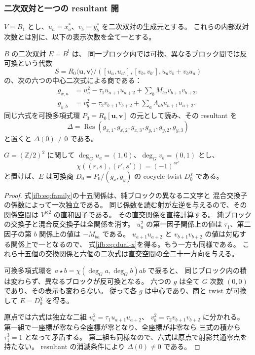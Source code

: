 \subsubsection{二次双対と一つの resultant 開}

$V=B_1$ とし、$u_a=x_a^*$、$v_b=y_b^*$ を二次双対の生成元とする。
これらの内部双対次数とは別に、以下の表示次数を全て一とする。

\begin{proposition}
\label{ifb:prop:dual}
$B$ の二次双対 $E=B^!$ は、
同一ブロック内では可換、異なるブロック間では反可換という代数
\[
 S=R_0\langle\mathbf u,\mathbf v\rangle/
       ([u_a,u_{a'}],[v_b,v_{b'}],u_av_b+v_bu_a)
\]
の、次の六つの中心二次式による商である：
\begin{align}
 g_{x,a}&=u_a^2-\tau_1u_{a+1}u_{a+2}
                 +\sum_bM_{ba}v_{b+1}v_{b+2},\label{ifb:eq:dual-x}\\
 g_{y,b}&=v_b^2-\tau_2v_{b+1}v_{b+2}
                 +\sum_a\Lambda_{ab}u_{a+1}u_{a+2}.
                 \label{ifb:eq:dual-y}
\end{align}
同じ六式を可換多項式環
$P_0=R_0[\mathbf u,\mathbf v]$ の元として読み、その resultant を
\begin{equation}\label{ifb:eq:resultant}
       \Delta=\operatorname{Res}(g_{x,1},g_{x,2},g_{x,3},
                                  g_{y,1},g_{y,2},g_{y,3})
\end{equation}
と置くと $\Delta(0)\ne0$ である。

$G=(\mathbb Z/2)^2$ に関して $\deg_Gu_a=(1,0)$、$\deg_Gv_b=(0,1)$ とし、
\[
 \chi((r,s),(r',s'))=(-1)^{sr'}
\]
と置けば、$E$ は可換商 $D_0=P_0/(g_x,g_y)$ の cocycle twist $D_0^\chi$ である。
\end{proposition}

\begin{proof}
式\eqref{ifb:eq:family}の十五関係は、純ブロックの異なる二文字と
混合交換子の係数によって一次独立である。
同じ係数を読む射が左逆を与えるので、その関係空間は $V^{\otimes2}$ の直和因子である。
その直交関係を直接計算する。
純ブロックの交換子と混合反交換子は全関係を消す。
$u_a^2$ の第一因子関係上の値は $\tau_1$、第二因子の第 $b$ 関係上の値は $-M_{ba}$ である。
$u_{a+1}u_{a+2}$ と $v_{b+1}v_{b+2}$ の値は対応する関係上で一となるので、
式\eqref{ifb:eq:dual-x}を得る。もう一方も同様である。
これら十五個の交換関係と六個の二次式は直交空間の全二十一方向を与える。

可換多項式環を $a\star b=\chi(\deg_Ga,\deg_Gb)ab$ で捩ると、
同じブロック内の積は変わらず、異なるブロックが反可換となる。
六つの $g$ は全て $G$ 次数 $(0,0)$ であり、その表示も変わらない。
従って各 $g$ は中心であり、商と twist が可換して $E=D_0^\chi$ を得る。

原点では六式は独立な二組
$u_a^2=\tau_1u_{a+1}u_{a+2}$、
$v_b^2=\tau_2v_{b+1}v_{b+2}$ に分かれる。
第一組で一座標が零なら全座標が零となり、全座標が非零なら
三式の積から $\tau_1^3=1$ となって矛盾する。
第二組も同様なので、六式は原点で射影共通零点を持たない。
resultant の消滅条件により $\Delta(0)\ne0$ である。
\end{proof}

